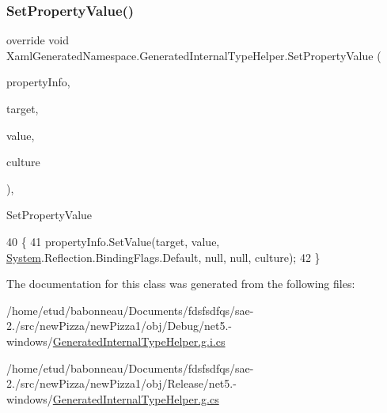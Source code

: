 \subsubsection{\texorpdfstring{Set\+Property\+Value()}{SetPropertyValue()}\hspace{0.1cm}{\footnotesize\ttfamily [3/3]}}
{\footnotesize\ttfamily override void Xaml\+Generated\+Namespace.\+Generated\+Internal\+Type\+Helper.\+Set\+Property\+Value (\begin{DoxyParamCaption}\item[{System.\+Reflection.\+Property\+Info}]{property\+Info,  }\item[{object}]{target,  }\item[{object}]{value,  }\item[{System.\+Globalization.\+Culture\+Info}]{culture }\end{DoxyParamCaption})\hspace{0.3cm}{\ttfamily [inline]}, {\ttfamily [protected]}}



Set\+Property\+Value 


\begin{DoxyCode}
40                                                                                                            
                                                                \{
41             propertyInfo.SetValue(target, value, \hyperlink{namespaceSystem}{System}.Reflection.BindingFlags.Default, null, null, 
      culture);
42         \}
\end{DoxyCode}


The documentation for this class was generated from the following files\+:\begin{DoxyCompactItemize}
\item 
/home/etud/babonneau/\+Documents/fdsfsdfqs/sae-\/2./src/new\+Pizza/new\+Pizza1/obj/\+Debug/net5.-\/windows/\hyperlink{net5_80-windows_2GeneratedInternalTypeHelper_8g_8i_8cs}{Generated\+Internal\+Type\+Helper.\+g.\+i.\+cs}\item 
/home/etud/babonneau/\+Documents/fdsfsdfqs/sae-\/2./src/new\+Pizza/new\+Pizza1/obj/\+Release/net5.-\/windows/\hyperlink{GeneratedInternalTypeHelper_8g_8cs}{Generated\+Internal\+Type\+Helper.\+g.\+cs}\end{DoxyCompactItemize}
